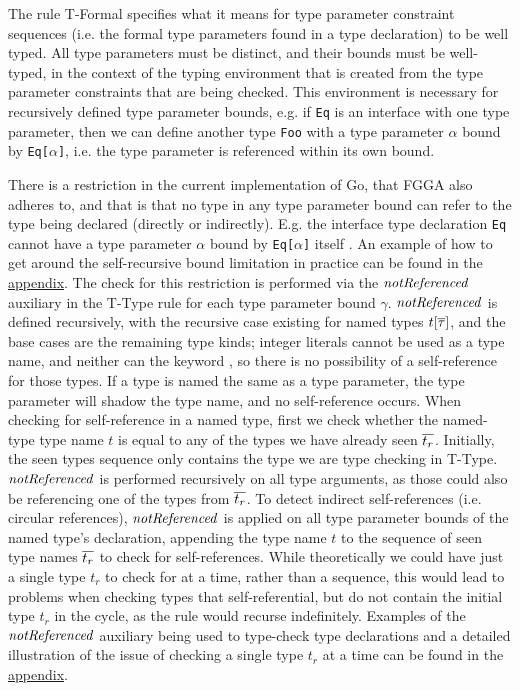 The rule T-Formal specifies what it means for type parameter constraint
sequences (i.e. the formal type parameters found in a type declaration) to be
well typed. All type parameters must be distinct, and their bounds must be
well-typed, in the context of the typing environment that is created from the
type parameter constraints that are being checked. This environment is necessary
for recursively defined type parameter bounds, e.g. if \texttt{Eq} is an
interface with one type parameter, then we can define another type \texttt{Foo}
with a type parameter $\alpha$ bound by \texttt{Eq[$\alpha$]}, i.e. the type
parameter is referenced within its own bound.

There is a restriction in the current implementation of Go, that FGGA also
adheres to, and that is that no type in any type parameter bound can refer to
the type being declared (directly or indirectly). E.g. the interface type
declaration \texttt{Eq} cannot have a type parameter $\alpha$ bound by
\texttt{Eq[$\alpha$]} itself \autocite{spec}.
An example of how to get around the self-recursive bound limitation in practice
can be found in the \hyperref[sec:self-ref-type-in-bound]{appendix}.
The check for this restriction is performed via the $\mathit{notReferenced}$ auxiliary in the
T-Type rule for each type parameter bound $\gamma$. $\mathit{notReferenced}$ is defined
recursively, with the recursive case existing for named types $t[\overline{\tau}]$,
and the base cases are the remaining type kinds; integer literals cannot be used
as a type name, and neither can the keyword , so there is no
possibility of a self-reference for those types. If a type is named the same as
a type parameter, the type parameter will shadow the type name, and no
self-reference occurs.
When checking for self-reference in a named type, first we check whether the
named-type type name $t$ is equal to any of the types we have already seen
$\overline{t_r}$. Initially, the seen types sequence only contains the type we are
type checking in T-Type. $\mathit{notReferenced}$ is performed recursively on all type
arguments, as those could also be referencing one of the types from $\overline{t_r}$.
To detect indirect self-references (i.e. circular references), $\mathit{notReferenced}$ is
applied on all type parameter bounds of the named type's declaration, appending
the type name $t$ to the sequence of seen type names $\overline{t_r}$ to check for
self-references. While theoretically we could have just a single type $t_r$ to
check for at a time, rather than a sequence, this would lead to problems when
checking types that self-referential, but do not contain the initial type $t_r$
in the cycle, as the rule would recurse indefinitely. Examples of the $\mathit{notReferenced}$
auxiliary being used to type-check type declarations and a detailed illustration
of the issue of checking a single type $t_r$ at a time can be found in the
\hyperref[sec:fgg-self-ref-derivation-examples]{appendix}.

